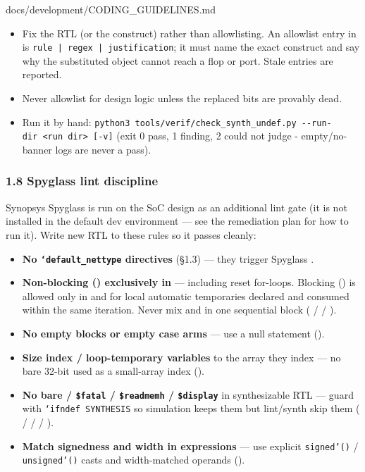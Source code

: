 \begin{relocated}{docs/development/CODING_GUIDELINES.md}
\begin{itemize}
\tightlist
\item
  Fix the RTL (or the construct) rather than allowlisting. An allowlist
  entry in  is
  \texttt{rule\ |\ regex\ |\ justification}; it must name the exact
  construct and say why the substituted object cannot reach a flop or
  port. Stale entries are reported.
\item
  Never allowlist  for design logic unless the
  replaced bits are provably dead.
\item
  Run it by hand:
  \texttt{python3\ tools/\allowbreak{}verif/\allowbreak{}check\_\allowbreak{}synth\_\allowbreak{}undef.\allowbreak{}py\ -\allowbreak{}-\allowbreak{}run-\allowbreak{}dir\ <run\ dir>\ [-\allowbreak{}v]}
  (exit 0 pass, 1 finding, 2 could not judge -
  empty/\allowbreak{}no-banner logs are never a pass).
\end{itemize}

\subsubsection{1.8 Spyglass lint discipline}\label{um:guide:coding-guidelines:18-spyglass-lint-discipline}

Synopsys Spyglass is run on the SoC design as an additional lint gate
(it is not installed in the default dev environment --- see the
remediation plan for how to run it). Write new RTL to these rules so it
passes cleanly:

\begin{itemize}
\tightlist
\item
  \textbf{No \texttt{`default\_\allowbreak{}nettype} directives} (§1.3)
  --- they trigger Spyglass .
\item
  \textbf{Non-blocking (\code{<=}) exclusively in } ---
  including reset for-loops. Blocking (\code{=}) is allowed only in
   and for local automatic temporaries declared and
  consumed within the same iteration. Never mix \code{=} and \code{<=}
  in one sequential block ( /  /
  ).
\item
  \textbf{No empty  blocks or empty case arms} --- use a
  null statement \code{;} ().
\item
  \textbf{Size index / loop-temporary variables} to the array they index
  --- no bare 32-bit  used as a small-array index
  ().
\item
  \textbf{No bare  / \texttt{\$fatal} /
  \texttt{\$readmemh} / \texttt{\$display}} in synthesizable RTL ---
  guard with \texttt{`ifndef\ SYNTHESIS} so simulation keeps them but
  lint/\allowbreak{}synth skip them ( / 
  /  / ).
\item
  \textbf{Match signedness and width in expressions} --- use explicit
  \texttt{signed'()} / \texttt{unsigned'()} casts and width-matched
  operands ().
\end{itemize}


\end{relocated}
